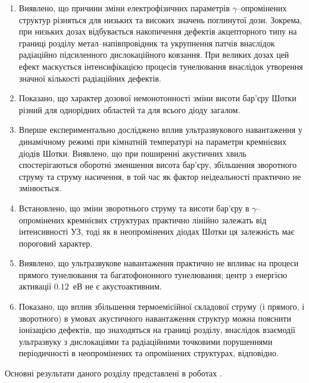 \begin{enumerate}
\item Виявлено, що причини зміни електрофізичних параметрів $\gamma$--оп\-ро\-мі\-не\-них структур різняться для низьких та високих значень поглинутої дози.
      Зокрема, при низьких дозах відбувається накопичення дефектів акцепторного типу на границі розділу
метал--напівпровідник та укрупнення патчів внаслідок радіаційно підсиленного дислокаційного ковзання.
 При великих дозах цей ефект маскується інтенсифікацією процесів тунелювання внаслідок утворення значної кількості радіаційних дефектів.

\item Показано, що характер дозової немонотонності зміни висоти бар'єру Шотки різний для
      однорідних областей та для всього діоду загалом.

     \item Вперше експериментально досліджено вплив ультразвукового навантаження у динамічному режимі при кімнатній температурі
           на параметри кремнієвих діодів Шотки.
           Виявлено, що при поширенні акустичних хвиль спостерігаються оборотні зменшення висота бар'єру,
збільшення зворотного струму та струму насичення, в той час як фактор неідеальності практично не змінюється.

\item Встановлено, що зміни зворотнього струму та висоти бар'єру в $\gamma$--опромінених кремнієвих структурах практично лінійно залежать від інтенсивності УЗ,
    тоді як в неопромінених діодах Шотки ця залежність має пороговий характер.

    \item Виявлено, що ультразвукове навантаження практично не впливає на процеси прямого тунелювання та багатофононного тунелювання;
     центр з енергією активації $0.12$~еВ не є акустоактивним.

\item Показано, що вплив збільшення термоемісійної складової струму (і прямого, і зворотного) в умовах акустичного навантаження структур можна пояснити іонізацією дефектів, що знаходяться на границі розділу,
  внаслідок взаємодії ультразвуку з дислокаціями та радіаційними точковими порушеннями періодичності в неопромінених та опромінених структурах, відповідно.

  \end{enumerate}	

Основні результати даного розділу представлені в роботах \cite{Olikh:2013IEEE,Olikh:UPJ2013,Olikh:FTP2013,Olikh:SEMT2013,
Olikh:Ultras,7Drog,5UNCPS,2012Ternop,14Plivk,6UNCPS,2014IUS}.
